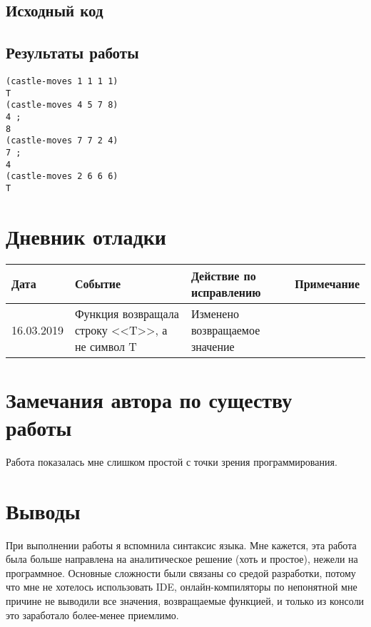 \documentclass[12pt]{article}
\begin{document}
\subsection{Исходный код}


\subsection{Результаты работы}
\begin{lstlisting}
(castle-moves 1 1 1 1)
T
(castle-moves 4 5 7 8)
4 ;
8
(castle-moves 7 7 2 4)
7 ;
4
(castle-moves 2 6 6 6)
T
\end{lstlisting}

\section{Дневник отладки}
\begin{tabular}{|p{50pt}|p{130pt}|p{130pt}|p{70pt}|}
\hline
Дата & Событие & Действие по исправлению & Примечание \\ \hline
16.03.2019 & Функция возвращала строку <<T>>, а не символ T & Изменено возвращаемое значение &\\
\hline
\end{tabular}

\section{Замечания автора по существу работы}
Работа показалась мне слишком простой с точки зрения программирования. 

\section{Выводы}
При выполнении работы я вспомнила синтаксис языка. Мне кажется, эта работа была больше направлена на аналитическое решение (хоть и простое), нежели на программное. Основные сложности были связаны со средой разработки, потому что мне не хотелось использовать IDE, онлайн-компиляторы по непонятной мне причине не выводили все значения, возвращаемые функцией, и только из консоли это заработало более-менее приемлимо.
\end{document}
